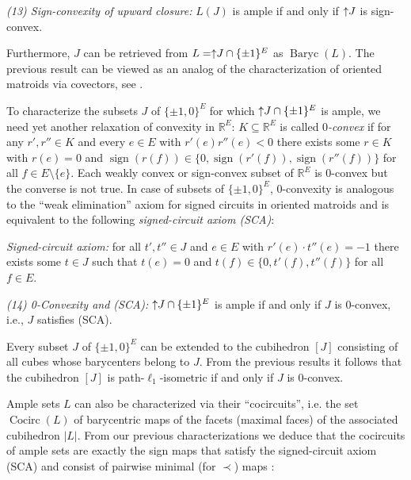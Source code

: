 \documentclass[11pt,a4paper]{amsart}
\theoremstyle{definition}
\numberwithin{equation}{section}
\DeclareMathOperator{\sign}{sign}
\DeclareMathOperator{\Baryc}{Baryc}
\DeclareMathOperator{\Cocirc}{Cocirc}
\newcommand{\covectors}{\ensuremath{L}}
\newcommand{\hcovectors}{J}
\begin{document}
\medskip\noindent
{\it {\rm(13)} Sign-convexity of upward closure:}   $\covectors(\hcovectors)$ is ample if and only if $\uparrow\hspace*{-0.1cm}\hcovectors$ is sign-convex.

\medskip
Furthermore,  $\hcovectors$  can be retrieved from $\covectors=\uparrow\hspace*{-0.1cm}\hcovectors\cap \{ \pm 1\}^E$ as
$\Baryc(\covectors)$. The previous result can be viewed as an analog of the characterization of oriented matroids via covectors, see \cite{BjLVStWhZi}.

To characterize the subsets $\hcovectors$ of $\{ \pm 1, 0\}^E$ for which $\uparrow\hspace*{-0.1cm}\hcovectors\cap \{ \pm 1\}^E$  is ample, we need yet another relaxation of convexity in ${\mathbb R}^E$: $K\subseteq {\mathbb R}^E$ is called \emph{$0$-convex} if for any $r',r''\in K$ and every $e\in E$ with $r'(e)r''(e)<0$ there exists some  $r\in K$ with $r(e)=0$ and $\sign(r(f))\in \{ 0, \sign(r'(f)),\sign(r''(f))\}$ for all $f\in E\setminus \{ e\}$.
Each weakly convex or sign-convex subset of  ${\mathbb R}^E$ is 0-convex but the converse is not true. In case of subsets of $\{ \pm 1, 0\}^E$, 0-convexity is analogous to the ``weak elimination'' axiom for signed circuits in oriented matroids  \cite{BjLVStWhZi} and is equivalent to the following  {\it signed-circuit axiom (SCA)}:

\medskip\noindent
{\it Signed-circuit axiom:} for all  $t',t''\in {\hcovectors}$ and   $e\in E$   with
$r'(e)\cdot t''(e)=-1$ there exists  some
$t\in {\hcovectors}$ such that  $t(e)=0$ and $t(f)\in \{ 0,t'(f),t''(f)\}$
for all  $f\in E.$


\medskip\noindent
{\it {\rm(14)} 0-Convexity and (SCA):}   $\uparrow\hspace*{-0.1cm}\hcovectors\cap \{ \pm 1\}^E$ is ample if and only if $\hcovectors$ is 0-convex, i.e., $\hcovectors$ satisfies (SCA).

\medskip
Every subset $\hcovectors$  of $\{ \pm 1,0\}^E$ can be extended to the cubihedron $[{\hcovectors}]$
consisting of all cubes whose
barycenters belong to $\hcovectors$. From the previous results it follows that the cubihedron $[{\hcovectors}]$ is
path-$\ell_1$-isometric if and only if $\hcovectors$ is 0-convex.


Ample sets $\covectors$ can also be characterized via their ``cocircuits'', i.e. the set $\Cocirc(\covectors)$ of
barycentric maps of the facets (maximal faces) of the associated cubihedron
$|{\covectors}|$. From our previous characterizations  we deduce that the cocircuits of ample sets are exactly the sign maps  that satisfy the signed-circuit axiom (SCA)  and consist of pairwise minimal (for $\prec$)  maps :
\end{document}
